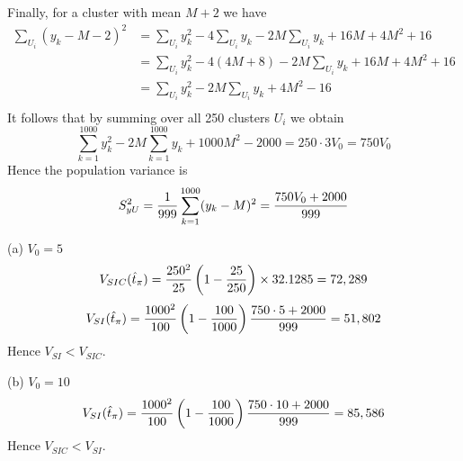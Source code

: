 \documentclass[12pt]{article}
\begin{document}
%
Finally, for a cluster with mean $M+2$ we have
\begin{align*}
\sum_{U_i}(y_k-M-2)^2
&=
\sum_{U_i}y_k^2-4\sum_{U_i}y_k-2M\sum_{U_i}y_k+16M+4M^2+16\\
&=
\sum_{U_i}y_k^2-4(4M+8)-2M\sum_{U_i}y_k+16M+4M^2+16\\
&=
\sum_{U_i}y_k^2-2M\sum_{U_i}y_k+4M^2-16\\
\end{align*}
It follows that by summing over all 250 clusters $U_i$ we obtain
\[
\sum_{k=1}^{1000}y_k^2-2M\sum_{k=1}^{1000}y_k+1000M^2-2000
=250\cdot3V_0=750V_0
\]
%
Hence the population variance is
\[
S_{yU}^2={1\over999}\sum_{k=1}^{1000}(y_k-M)^2={750V_0+2000\over999}
\]

(a) $V_0=5$
\[
V_{SIC}(\hat t_\pi)={250^2\over25}
\left(1-{25\over250}\right)\times32.1285=72,289
\]
\[
V_{SI}(\hat t_\pi)={1000^2\over 100}\left(1-{100\over1000}\right)
{750\cdot5+2000\over999}
=51,802
\]
Hence $V_{SI}<V_{SIC}$.

(b) $V_0=10$
\[
V_{SI}(\hat t_\pi)={1000^2\over 100}\left(1-{100\over1000}\right)
{750\cdot10+2000\over999}
=85,586
\]
Hence $V_{SIC}<V_{SI}$.

\end{document}
